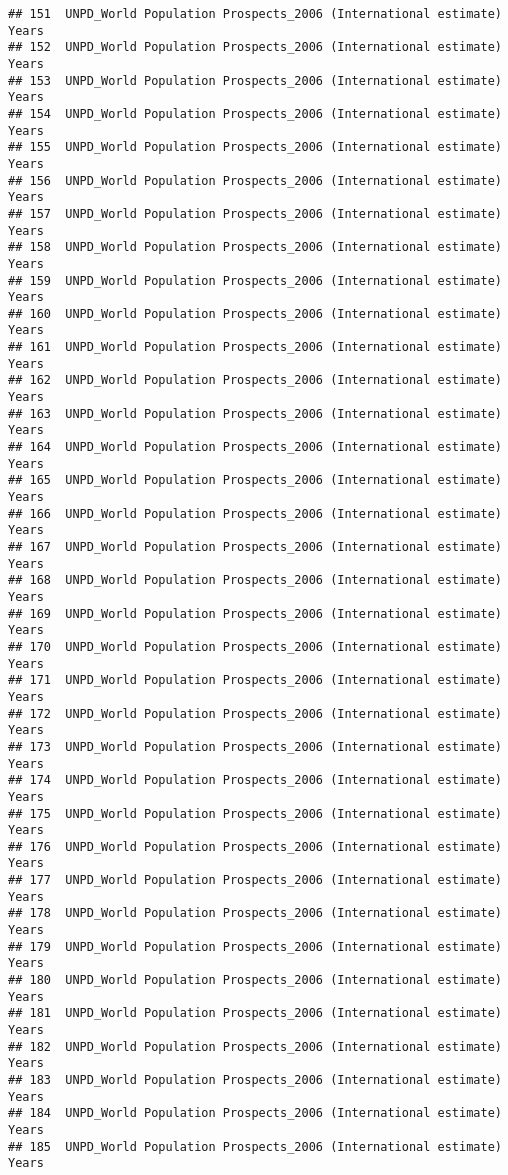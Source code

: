 \documentclass[]{article}
\begin{document}
\begin{verbatim}
## 151  UNPD_World Population Prospects_2006 (International estimate) Years
## 152  UNPD_World Population Prospects_2006 (International estimate) Years
## 153  UNPD_World Population Prospects_2006 (International estimate) Years
## 154  UNPD_World Population Prospects_2006 (International estimate) Years
## 155  UNPD_World Population Prospects_2006 (International estimate) Years
## 156  UNPD_World Population Prospects_2006 (International estimate) Years
## 157  UNPD_World Population Prospects_2006 (International estimate) Years
## 158  UNPD_World Population Prospects_2006 (International estimate) Years
## 159  UNPD_World Population Prospects_2006 (International estimate) Years
## 160  UNPD_World Population Prospects_2006 (International estimate) Years
## 161  UNPD_World Population Prospects_2006 (International estimate) Years
## 162  UNPD_World Population Prospects_2006 (International estimate) Years
## 163  UNPD_World Population Prospects_2006 (International estimate) Years
## 164  UNPD_World Population Prospects_2006 (International estimate) Years
## 165  UNPD_World Population Prospects_2006 (International estimate) Years
## 166  UNPD_World Population Prospects_2006 (International estimate) Years
## 167  UNPD_World Population Prospects_2006 (International estimate) Years
## 168  UNPD_World Population Prospects_2006 (International estimate) Years
## 169  UNPD_World Population Prospects_2006 (International estimate) Years
## 170  UNPD_World Population Prospects_2006 (International estimate) Years
## 171  UNPD_World Population Prospects_2006 (International estimate) Years
## 172  UNPD_World Population Prospects_2006 (International estimate) Years
## 173  UNPD_World Population Prospects_2006 (International estimate) Years
## 174  UNPD_World Population Prospects_2006 (International estimate) Years
## 175  UNPD_World Population Prospects_2006 (International estimate) Years
## 176  UNPD_World Population Prospects_2006 (International estimate) Years
## 177  UNPD_World Population Prospects_2006 (International estimate) Years
## 178  UNPD_World Population Prospects_2006 (International estimate) Years
## 179  UNPD_World Population Prospects_2006 (International estimate) Years
## 180  UNPD_World Population Prospects_2006 (International estimate) Years
## 181  UNPD_World Population Prospects_2006 (International estimate) Years
## 182  UNPD_World Population Prospects_2006 (International estimate) Years
## 183  UNPD_World Population Prospects_2006 (International estimate) Years
## 184  UNPD_World Population Prospects_2006 (International estimate) Years
## 185  UNPD_World Population Prospects_2006 (International estimate) Years

\end{verbatim}
\end{document}
